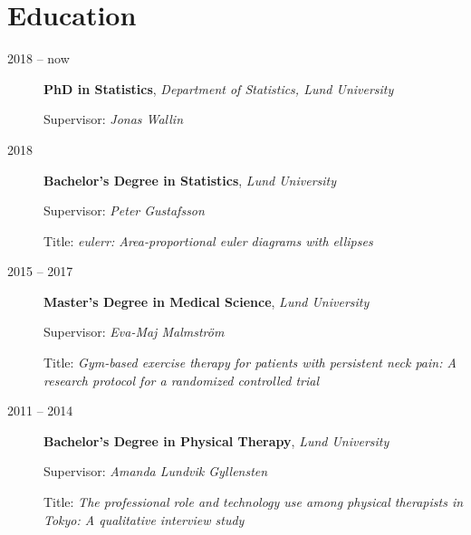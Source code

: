 \documentclass[
  10pt,
  headsepline=true,
  english,
  DIV=12
]{scrartcl}
\renewcommand*{%
  \mkbibnamegiven
}[1]{\ifitemannotation{highlight}{\textbf{#1}}{#1}}
\renewcommand*{%
  \mkbibnamefamily
}[1]{\ifitemannotation{highlight}{\textbf{#1}}{#1}}
\begin{document}

\hypertarget{education}{%
  \section{Education}\label{education}}


\begin{description}
  \item[2018 -- now] {
        \textbf{PhD in Statistics}, \emph{Department of Statistics, Lund
          University}

        Supervisor: \emph{Jonas Wallin}
        }

  \item[2018] {
        \textbf{Bachelor's Degree in Statistics}, \emph{Lund University}

        Supervisor: \emph{Peter Gustafsson}

        Title: \emph{eulerr: Area-proportional euler diagrams with ellipses}
        }

  \item[2015 -- 2017] {
        \textbf{Master's Degree in Medical Science}, \emph{Lund University}

        Supervisor: \emph{Eva-Maj Malmström}

        Title: \emph{Gym-based exercise therapy for patients with persistent
          neck pain: A research protocol for a randomized controlled trial}
        }

  \item[2011 -- 2014] {
        \textbf{Bachelor's Degree in Physical Therapy}, \emph{Lund University}

        Supervisor: \emph{Amanda Lundvik Gyllensten}

        Title: \emph{The professional role and technology use among physical
          therapists in Tokyo: A qualitative interview study}
        }
\end{description}


\end{document}
